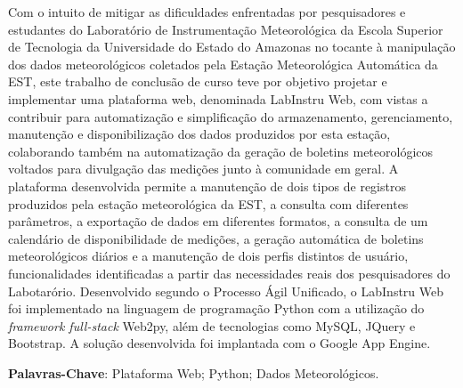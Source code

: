 

Com o intuito de mitigar as dificuldades enfrentadas por pesquisadores e estudantes do Laboratório de Instrumentação Meteorológica da Escola Superior de Tecnologia da Universidade do Estado do Amazonas no tocante à manipulação dos dados meteorológicos coletados pela Estação Meteorológica Automática da EST, este trabalho de conclusão de curso teve por objetivo projetar e implementar uma plataforma web, denominada LabInstru Web, com vistas a contribuir para automatização e simplificação do armazenamento, gerenciamento, manutenção e disponibilização dos dados produzidos por esta estação, colaborando também na automatização da geração de boletins meteorológicos voltados para divulgação das medições junto à comunidade em geral. A plataforma desenvolvida permite a manutenção de dois tipos de registros produzidos pela estação meteorológica da EST, a consulta com diferentes parâmetros, a exportação de dados em diferentes formatos, a consulta de um calendário de disponibilidade de medições, a geração automática de boletins meteorológicos diários e a manutenção de dois perfis distintos de usuário, funcionalidades identificadas a partir das necessidades reais dos pesquisadores do Labotarório. Desenvolvido segundo o Processo Ágil Unificado, o LabInstru Web foi implementado na linguagem de programação Python com a utilização do \emph{framework full-stack} Web2py, além de tecnologias como MySQL, JQuery e Bootstrap. A solução desenvolvida foi implantada com o Google App Engine.


\noindent \textbf{Palavras-Chave}: Plataforma Web; Python; Dados Meteorológicos.
